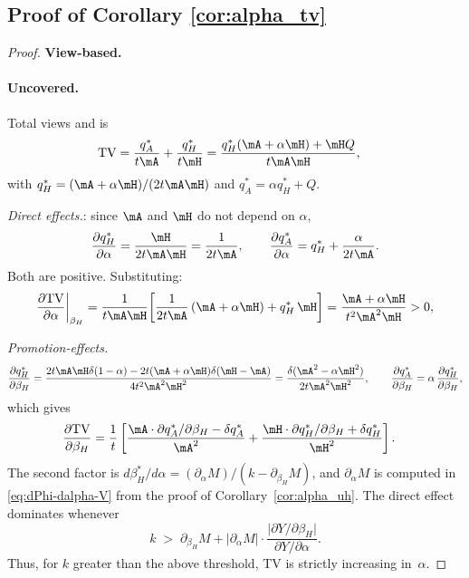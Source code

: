 \subsection*{Proof of Corollary \ref{cor:alpha_tv}}
\begin{proof}
\textbf{View-based.}
\paragraph{Uncovered.}\;
Total views and is
\begin{align*}
\text{TV} &= \frac{q_A^*}{t\mA} + \frac{q_H^*}{t\mH}
= \frac{q_H^*(\mA + \alpha\mH) + \mH Q}{t\mA\mH},
\end{align*}
with $q_H^* = (\mA+\alpha\mH)/(2t\mA\mH)$ and $q_A^* = \alpha q_H^* + Q$.

\emph{Direct effects.}: since $\mA$ and $\mH$
do not depend on $\alpha$,
\[
\frac{\partial q_H^*}{\partial\alpha}
= \frac{\mH}{2t\mA\mH} = \frac{1}{2t\mA},
\qquad
\frac{\partial q_A^*}{\partial\alpha} = q_H^* + \frac{\alpha}{2t\mA}.
\]
Both are positive. Substituting:
\[
\frac{\partial\text{TV}}{\partial\alpha}\bigg|_{\beta_H}
= \frac{1}{t\mA\mH}\!\left[\frac{1}{2t\mA}\,(\mA+\alpha\mH) + q_H^*\,\mH\right]
= \frac{\mA+\alpha\mH}{t^2\mA^2\mH} > 0,
\]

\emph{Promotion-effects.} 
\[
\frac{\partial q_H^*}{\partial\beta_H}
= \frac{2t\mA\mH\delta(1-\alpha) - 2t(\mA+\alpha\mH)\delta(\mH-\mA)}{4t^2\mA^2\mH^2} 
=\frac{\delta(\mA^2 - \alpha\mH^2)}{2t\mA^2\mH^2},
\qquad
\frac{\partial q_A^*}{\partial\beta_H} = \alpha\,\frac{\partial q_H^*}{\partial\beta_H},
\]
which gives
\begin{align*}
\frac{\partial\text{TV}}{\partial\beta_H}
& = \frac{1}{t} \left[ \frac{\mA\cdot \partial q_A^*/\partial \beta_H - \delta q_A^*}{\mA^2} + \frac{\mH\cdot \partial q_H^*/\partial \beta_H + \delta q_H^*}{\mH^2} \right].
\end{align*}
The second factor is
$d\beta_H^*/d\alpha = (\partial_\alpha M)/(k - \partial_{\beta_H}M)$, and $\partial_\alpha M$ is computed in \eqref{eq:dPhi-dalpha-V} from the proof of Corollary~\ref{cor:alpha_uh}. The direct effect dominates whenever
\begin{equation}\label{eq:kbar-alpha-Y-V}
k \;>\; \partial_{\beta_H} M
+ \bigl|\partial_\alpha M\bigr|\cdot
\frac{\bigl|\partial Y/\partial\beta_H\bigr|}{\partial Y/\partial\alpha}.
\end{equation}
Thus, for $k$ greater than the above threshold, TV is strictly increasing in~$\alpha$.

\medskip

\end{proof}
